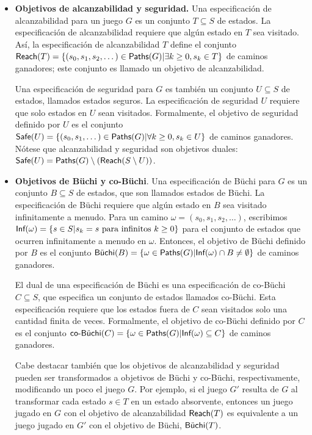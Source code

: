\begin{itemize}
	\item \textbf{Objetivos de alcanzabilidad y seguridad.} Una especificación de alcanzabilidad para un juego $G$ es un conjunto $T \subseteq S$ de estados. La especificación de alcanzabilidad requiere que algún estado en $T$ sea visitado. Así, la especificación de alcanzabilidad $T$ define el conjunto $\Reach(T) = \{(s_0, s_1, s_2, \dots) \in \Paths(G) | \exists k \geq 0, s_k \in T\}$ de caminos ganadores; este conjunto es llamado un objetivo de alcanzabilidad.

	      Una especificación de seguridad para $G$ es también un conjunto $U \subseteq S$
	      de estados, llamados estados seguros. La especificación de seguridad $U$
	      requiere que solo estados en $U$ sean visitados. Formalmente, el objetivo de
	      seguridad definido por $U$ es el conjunto $\Safe(U) = \{(s_0, s_1, \dots) \in
		      \Paths(G) | \forall k \geq 0, s_k \in U\}$ de caminos ganadores. Nótese que
	      alcanzabilidad y seguridad son objetivos duales: $\Safe(U) = \Paths(G)
		      \setminus (\Reach(S \setminus U))$.

	\item \textbf{Objetivos de Büchi y co-Büchi}. Una especificación de Büchi para $G$ es un conjunto $B \subseteq S$ de estados, que son llamados estados de Büchi. La especificación de Büchi requiere que algún estado en $B$ sea visitado infinitamente a menudo. Para un camino $\omega = (s_0, s_1, s_2, \dots)$, escribimos $\Inf(\omega) = \{s \in S | s_k = s \text{ para infinitos } k \geq 0\}$ para el conjunto de estados que ocurren infinitamente a menudo en $\omega$. Entonces, el objetivo de Büchi definido por $B$ es el conjunto $\Buchi(B) = \{\omega \in \Paths(G) | \Inf(\omega) \cap B \neq \emptyset\}$ de caminos ganadores.

	      El dual de una especificación de Büchi es una especificación de co-Büchi $C
		      \subseteq S$, que especifica un conjunto de estados llamados co-Büchi. Esta
	      especificación requiere que los estados fuera de $C$ sean visitados solo una
	      cantidad finita de veces. Formalmente, el objetivo de co-Büchi definido por $C$
	      es el conjunto $\coBuchi(C) = \{\omega \in \Paths(G) | \Inf (\omega) \subseteq
		      C\}$ de caminos ganadores.

	      Cabe destacar también que los objetivos de alcanzabilidad y seguridad pueden
	      ser transformados a objetivos de Büchi y co-Büchi, respectivamente, modificando
	      un poco el juego $G$. Por ejemplo, si el juego $G'$ resulta de $G$ al
	      transformar cada estado $s \in T$ en un estado absorvente, entonces un juego
	      jugado en $G$ con el objetivo de alcanzabilidad $\Reach(T)$ es equivalente a un
	      juego jugado en $G'$ con el objetivo de Büchi, $\Buchi(T)$.


\end{itemize}
